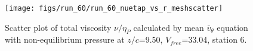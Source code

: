 \begin{figure}[H]
\centering
\texttt{[image: figs/run\_60/run\_60\_nuetap\_vs\_r\_meshscatter]}
\caption{Scatter plot of total viscosity $\nu / \eta_P$ calculated by mean $\bar{v}_{\theta}$ equation with non-equilibrium pressure at $z/c$=9.50, $V_{free}$=33.04, station 6.}
\label{fig:run_60_nuetap_vs_r_meshscatter}
\end{figure}


